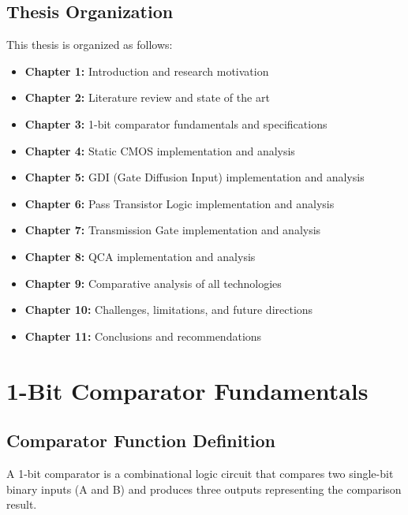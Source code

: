 \documentclass[12pt,a4paper,twoside]{report}
\begin{document}
\section{Thesis Organization}

This thesis is organized as follows:

\begin{itemize}
    \item \textbf{Chapter 1:} Introduction and research motivation
    \item \textbf{Chapter 2:} Literature review and state of the art
    \item \textbf{Chapter 3:} 1-bit comparator fundamentals and specifications
    \item \textbf{Chapter 4:} Static CMOS implementation and analysis
    \item \textbf{Chapter 5:} GDI (Gate Diffusion Input) implementation and analysis
    \item \textbf{Chapter 6:} Pass Transistor Logic implementation and analysis
    \item \textbf{Chapter 7:} Transmission Gate implementation and analysis
    \item \textbf{Chapter 8:} QCA implementation and analysis
    \item \textbf{Chapter 9:} Comparative analysis of all technologies
    \item \textbf{Chapter 10:} Challenges, limitations, and future directions
    \item \textbf{Chapter 11:} Conclusions and recommendations
\end{itemize}

\chapter{1-Bit Comparator Fundamentals}
\label{ch:fundamentals}

\section{Comparator Function Definition}

A 1-bit comparator is a combinational logic circuit that compares two single-bit binary inputs (A and B) and produces three outputs representing the comparison result.
\end{document}
